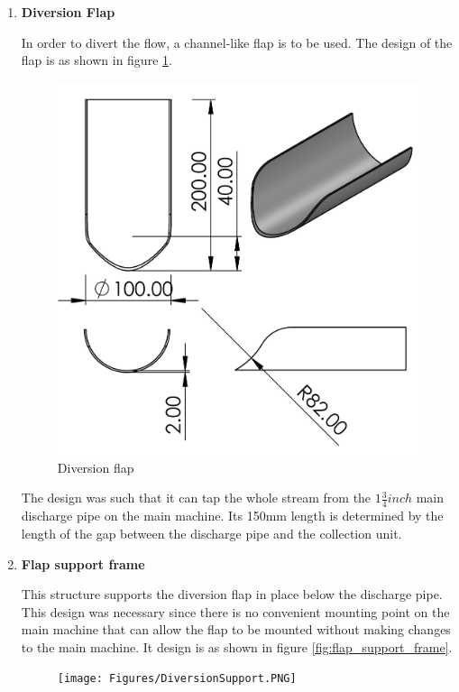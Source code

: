 \begin{enumerate}
    \item \textbf{Diversion Flap}
    \par
    In order to divert the flow, a channel-like flap is to be used. The design of the flap is as shown in figure \ref{fig:diversion_flap}. 
    \begin{figure}[H]
        \centering
        \includegraphics[height=.5\textheight]{Figures/flap2.PNG}
        \caption{Diversion flap}
        \label{fig:diversion_flap}
    \end{figure}
    The design was such that it can tap the whole stream from the $1\frac{3}{4} inch$ main discharge pipe on the main machine. Its 150mm length is determined by the length of the gap between the discharge pipe and the collection unit.
    \item \textbf{Flap support frame}
    \par
    This structure supports the diversion flap in place below the discharge pipe. This design was necessary since there is no convenient mounting point on the main machine that can allow the flap to be mounted without making changes to the main machine. It design is as shown in figure \ref{fig:flap_support_frame}.
    \begin{figure}[H]
        \centering
        \texttt{[image: Figures/DiversionSupport.PNG]}

\end{figure}
\end{enumerate}
